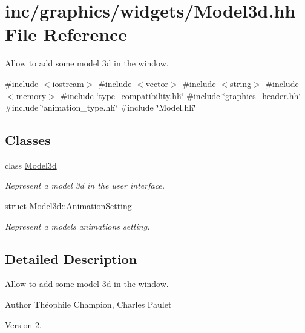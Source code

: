 \hypertarget{Model3d_8hh}{}\section{inc/graphics/widgets/\+Model3d.hh File Reference}
\label{Model3d_8hh}


Allow to add some model 3d in the window.  


{\ttfamily \#include $<$iostream$>$}\newline
{\ttfamily \#include $<$vector$>$}\newline
{\ttfamily \#include $<$string$>$}\newline
{\ttfamily \#include $<$memory$>$}\newline
{\ttfamily \#include \char`\"{}type\+\_\+compatibility.\+hh\char`\"{}}\newline
{\ttfamily \#include \char`\"{}graphics\+\_\+header.\+hh\char`\"{}}\newline
{\ttfamily \#include \char`\"{}animation\+\_\+type.\+hh\char`\"{}}\newline
{\ttfamily \#include \char`\"{}Model.\+hh\char`\"{}}\newline
\subsection*{Classes}
\begin{DoxyCompactItemize}
\item 
class \hyperlink{classModel3d}{Model3d}
\begin{DoxyCompactList}\small\item\em Represent a model 3d in the user interface. \end{DoxyCompactList}\item 
struct \hyperlink{structModel3d_1_1AnimationSetting}{Model3d\+::\+Animation\+Setting}
\begin{DoxyCompactList}\small\item\em Represent a model\textquotesingle{}s animation\textquotesingle{}s setting. \end{DoxyCompactList}\end{DoxyCompactItemize}


\subsection{Detailed Description}
Allow to add some model 3d in the window. 

\begin{DoxyAuthor}{Author}
Théophile Champion, Charles Paulet 
\end{DoxyAuthor}
\begin{DoxyVersion}{Version}
2. 
\end{DoxyVersion}
